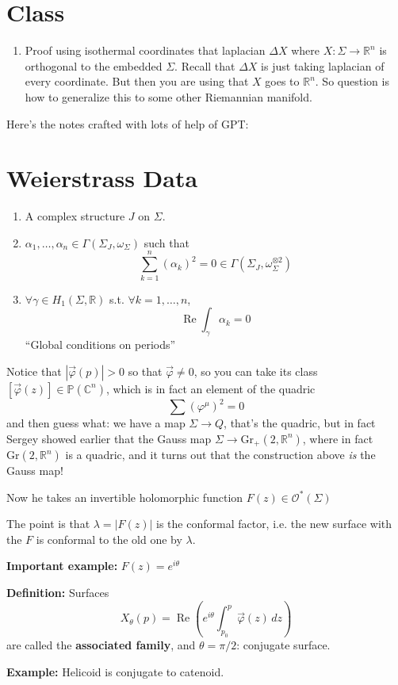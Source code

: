 



\section{Class}

\begin{enumerate}
\item Proof using isothermal coordinates that laplacian \(\Delta X\) where \(X: \Sigma \to \mathbb{R}^n\) is orthogonal to the embedded \(\Sigma\). Recall that \(\Delta X\) is just taking laplacian of every coordinate. But then you are using that  \(X\) goes to \(\mathbb{R}^n\). So question is how to generalize this to some other Riemannian manifold.
\end{enumerate}

Here's the notes crafted with lots of help of GPT:

\section*{Weierstrass Data}

\begin{enumerate}
    \item A complex structure \(J\) on \(\Sigma\).
    \item \(\alpha_1,\ldots,\alpha_n \in \Gamma(\Sigma_J,\omega_\Sigma)\) such that
    \[
    \sum_{k=1}^n(\alpha_k)^2=0 \in \Gamma(\Sigma_J,\omega_\Sigma^{\otimes 2})
    \]
    \item \(\forall \gamma \in H_1(\Sigma,\mathbb{R})\) s.t. \(\forall k=1,\ldots,n\),
    \[
    \operatorname{Re} \int_\gamma \alpha_k=0
    \]
    ``Global conditions on periods''
\end{enumerate}

Notice that \(|\vec{\varphi}(p)| > 0\) so that \(\vec{\varphi} \neq 0\), so you can take its class \([\vec\varphi(z)] \in \mathbb{P}(\mathbb{C}^n)\), which is in fact an element of the quadric
\[
\sum (\varphi^\mu)^2 = 0
\]
and then guess what: we have a map \(\Sigma \to Q\), that’s the quadric, but in fact Sergey showed earlier that the Gauss map \(\Sigma \to \mathrm{Gr}_+(2,\mathbb{R}^n)\), where in fact \(\mathrm{Gr}(2,\mathbb{R}^n)\) is a quadric, and it turns out that the construction above \emph{is} the Gauss map!

Now he takes an invertible holomorphic function \(F(z) \in \mathcal{O}^*(\Sigma)\)

The point is that \(\lambda = |F(z)|\) is the conformal factor, i.e. the new surface with the \(F\) is conformal to the old one by \(\lambda\).

\textbf{Important example:} \(F(z) = e^{i\theta}\)

\textbf{Definition:} Surfaces
\[
X_\theta(p) = \operatorname{Re} \left( e^{i\theta} \int_{p_0}^p \vec{\varphi}(z)\,dz \right)
\]
are called the \textbf{associated family}, and \(\theta = \pi/2\): conjugate surface.

\textbf{Example:} Helicoid is conjugate to catenoid.


\clearpage

